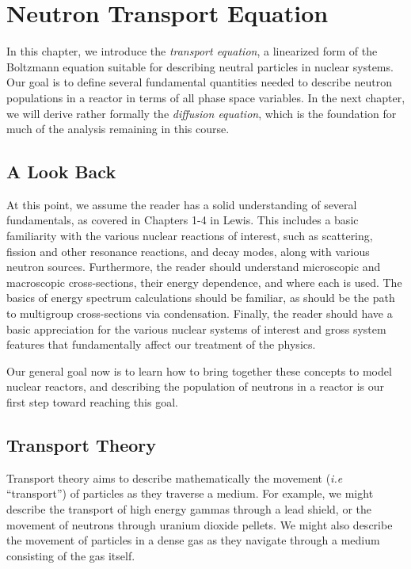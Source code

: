 \chapter{Neutron Transport Equation}
\label{chap:neut_transport} %

\abstract
{
In this chapter, we introduce the \textit{transport equation}, a linearized 
form of the Boltzmann equation suitable for describing neutral particles 
in nuclear systems.  Our goal is to define several fundamental quantities 
needed to describe neutron populations in a reactor in terms of all phase 
space variables. In the next 
chapter, we will derive rather formally the \textit{diffusion equation},
which is the foundation for much of the analysis remaining in this course.  
}

\section{A Look Back}

At this point, we assume the reader has a solid understanding of several 
fundamentals, as covered in Chapters 1-4 in Lewis.  This includes a basic 
familiarity with the various nuclear reactions of interest, such as 
scattering, fission and other resonance reactions, and decay modes, 
along with various neutron sources.  Furthermore, the reader should 
understand microscopic and macroscopic cross-sections, their energy 
dependence, and where each is used.  The basics of energy spectrum 
calculations should be familiar, as should be the path to multigroup 
cross-sections via condensation.  Finally, the reader should have a basic 
appreciation for the various nuclear systems of interest and gross system 
features that fundamentally affect our treatment of the physics.

Our general goal now is to learn how to bring together these concepts to 
model nuclear reactors, and describing the population of neutrons in a 
reactor is our first step toward reaching this goal.

\section{Transport Theory}

Transport theory aims to describe mathematically the movement 
(\textit{i.e} ``tra\-n\-s\-port'') of particles as they traverse a 
medium.  For example, we might describe the transport of high energy 
gammas through a lead shield, or the movement of neutrons through uranium 
dioxide pellets.  We might also describe the movement of particles in a 
dense gas as they navigate through a medium consisting of the gas itself.

